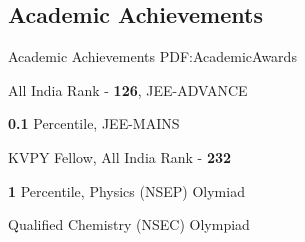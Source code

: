 \documentclass[letterpaper,10pt,oneside]{article}
\begin{document}
\begin{body}



\section
{Academic Achievements}
{Academic Achievements}
{PDF:AcademicAwards}

\BulletItem
All India Rank - \textbf{126}, JEE-ADVANCE
\hfill
{}

\Gap
\BulletItem
\textbf{0.1} Percentile, JEE-MAINS
\hfill
{}

\Gap
\BulletItem
KVPY Fellow, All India Rank - \textbf{232}
\hfill
{}

\Gap
\BulletItem
\textbf{1} Percentile, Physics (NSEP) Olymiad
\hfill
{}

\Gap
\BulletItem
Qualified Chemistry (NSEC) Olympiad
\hfill
{}







\end{body}
\end{document}
